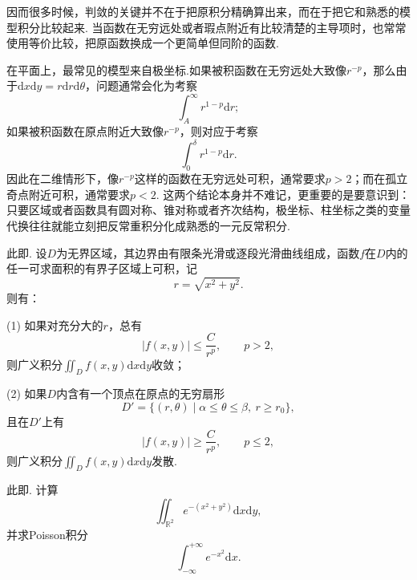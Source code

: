 \documentclass{ctexart}
\begin{document}
因而很多时候，判敛的关键并不在于把原积分精确算出来，而在于把它和熟悉的模型积分比较起来. 当函数在无穷远处或者瑕点附近有比较清楚的主导项时，也常常使用等价比较，把原函数换成一个更简单但同阶的函数.

在平面上，最常见的模型来自极坐标.如果被积函数在无穷远处大致像$r^{-p}$，那么由于$\mathrm{d}x\mathrm{d}y=r\mathrm{d}r\mathrm{d}\theta$，问题通常会化为考察
$$\int_{A}^{\infty}r^{1-p}\mathrm{d}r;$$
如果被积函数在原点附近大致像$r^{-p}$，则对应于考察
$$\int_{0}^{\delta}r^{1-p}\mathrm{d}r.$$
因此在二维情形下，像$r^{-p}$这样的函数在无穷远处可积，通常要求$p>2$；而在孤立奇点附近可积，通常要求$p<2$. 这两个结论本身并不难记，更重要的是要意识到：只要区域或者函数具有圆对称、锥对称或者齐次结构，极坐标、柱坐标之类的变量代换往往就能立刻把反常重积分化成熟悉的一元反常积分.
\begin{theorem}[Cauchy判别法]
此即\cite[22.4.2节中的Cauchy判别法]{XHM}. 设$D$为无界区域，其边界由有限条光滑或逐段光滑曲线组成，函数$f$在$D$内的任一可求面积的有界子区域上可积，记
$$r=\sqrt{x^{2}+y^{2}}.$$
则有：

(1) 如果对充分大的$r$，总有
$$|f(x,y)|\leqslant \frac{C}{r^{p}},\qquad p>2,$$
则广义积分$\iint_{D}{f(x,y)\mathrm{d}x\mathrm{d}y}$收敛；

(2) 如果$D$内含有一个顶点在原点的无穷扇形
$$D'=\{(r,\theta)\mid \alpha\leqslant \theta\leqslant \beta,\ r\geqslant r_{0}\},$$
且在$D'$上有
$$|f(x,y)|\geqslant \frac{C}{r^{p}},\qquad p\leqslant 2,$$
则广义积分$\iint_{D}{f(x,y)\mathrm{d}x\mathrm{d}y}$发散.
\end{theorem}

\begin{example}
此即\cite[例题22.4.1]{XHM}. 计算
$$\iint_{\mathbb{R}^{2}}{e^{-(x^{2}+y^{2})}\mathrm{d}x\mathrm{d}y},$$
并求Poisson积分
$$\int_{-\infty}^{+\infty}{e^{-x^{2}}\mathrm{d}x}.$$
\end{example}
\end{document}
